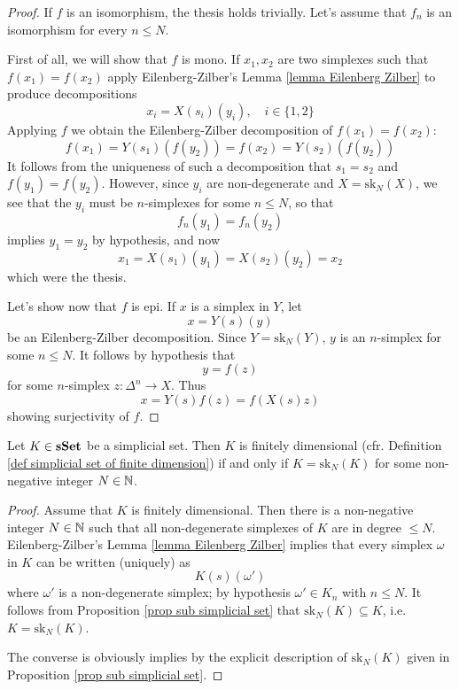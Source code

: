 \begin{refsection}
\begin{proof}
If $f$ is an isomorphism, the thesis holds trivially. Let's assume that $f_n$ is an isomorphism for every $n \le N$.

First of all, we will show that $f$ is mono. If $x_1,x_2$ are two simplexes such that $f(x_1) = f(x_2)$ apply Eilenberg-Zilber's Lemma \ref{lemma Eilenberg Zilber} to produce decompositions
\[
x_i = X(s_i)(y_i), \quad i \in \{ 1,2 \}
\]
Applying $f$ we obtain the Eilenberg-Zilber decomposition of $f(x_1) = f(x_2)$:
\[
f(x_1) = Y(s_1)(f(y_2)) = f(x_2) = Y(s_2)(f(y_2))
\]
It follows from the uniqueness of such a decomposition that $s_1 = s_2$ and $f(y_1) = f(y_2)$. However, since $y_i$ are non-degenerate and $X = \mathrm{sk}_N(X)$, we see that the $y_i$ must be $n$-simplexes for some $n \le N$, so that
\[
f_n(y_1) = f_n(y_2)
\]
implies $y_1 = y_2$ by hypothesis, and now
\[
x_1 = X(s_1)(y_1) = X(s_2)(y_2) = x_2
\]
which were the thesis.

Let's show now that $f$ is epi. If $x$ is a simplex in $Y$, let
\[
x = Y(s)(y)
\]
be an Eilenberg-Zilber decomposition. Since $Y = \mathrm{sk}_N(Y)$, $y$ is an $n$-simplex for some $n \le N$. It follows by hypothesis that
\[
y = f(z)
\]
for some $n$-simplex $z \colon \Delta^n \to X$. Thus
\[
x = Y(s)f(z) = f(X(s)z)
\]
showing surjectivity of $f$.
\end{proof}

\begin{prop}
Let $K \in \mathbf{sSet}$ be a simplicial set. Then $K$ is finitely dimensional (cfr. Definition \ref{def simplicial set of finite dimension}) if and only if $K = \mathrm{sk}_N(K)$ for some non-negative integer $N \in \mathbb{N}$.
\end{prop}

\begin{proof}
Assume that $K$ is finitely dimensional. Then there is a non-negative integer $N \in \mathbb{N}$ such that all non-degenerate simplexes of $K$ are in degree $\le N$. Eilenberg-Zilber's Lemma \ref{lemma Eilenberg Zilber} implies that every simplex $\omega$ in $K$ can be written (uniquely) as
\[
K(s)(\omega')
\]
where $\omega'$ is a non-degenerate simplex; by hypothesis $\omega' \in K_n$ with $n \le N$. It follows from Proposition \ref{prop sub simplicial set} that $\mathrm{sk}_N(K) \subseteq K$, i.e. $K = \mathrm{sk}_N(K)$.

The converse is obviously implies by the explicit description of $\mathrm{sk}_N(K)$ given in Proposition \ref{prop sub simplicial set}.
\end{proof}


\end{refsection}
